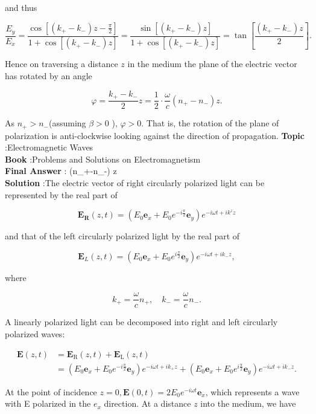 \documentclass[10pt]{article}
\begin{document}
and thus

$$
\frac{E_{y}}{E_{x}}=\frac{\cos \left[\left(k_{+}-k_{-}\right) z-\frac{\pi}{2}\right]}{1+\cos \left[\left(k_{+}-k_{-}\right) z\right]}=\frac{\sin \left[\left(k_{+}-k_{-}\right) z\right]}{1+\cos \left[\left(k_{+}-k_{-}\right) z\right]}=\tan \left[\frac{\left(k_{+}-k_{-}\right) z}{2}\right] .
$$

Hence on traversing a distance $z$ in the medium the plane of the electric vector has rotated by an angle

$$
\varphi=\frac{k_{+}-k_{-}}{2} z=\frac{1}{2} \cdot \frac{\omega}{c}\left(n_{+}-n_{-}\right) z .
$$

As $n_{+}>n_{-}$(assuming $\beta>0$ ), $\varphi>0$. That is, the rotation of the plane of polarization is anti-clockwise looking against the direction of propagation.
\textbf{Topic} :Electromagnetic Waves\\
\textbf{Book} :Problems and Solutions on Electromagnetism\\
\textbf{Final Answer} : \cdot {}\left(n_{+}-n_{-}\right) z\\


\textbf{Solution} :The electric vector of right circularly polarized light can be represented by the real part of

$$
\mathbf{E}_{\mathbf{R}}(z, t)=\left(E_{0} \mathbf{e}_{x}+E_{0} e^{-i \frac{\pi}{2}} \mathbf{e}_{y}\right) e^{-i \omega t+i k^{z} z}
$$

and that of the left circularly polarized light by the real part of

$$
\mathbf{E}_{L}(z, t)=\left(E_{0} \mathbf{e}_{x}+E_{0} e^{i \frac{\pi}{2}} \mathbf{e}_{y}\right) e^{-i \omega t+i k_{-} z},
$$

where

$$
k_{+}=\frac{\omega}{c} n_{+}, \quad k_{-}=\frac{\omega}{c} n_{-} .
$$

 A linearly polarized light can be decomposed into right and left circularly polarized waves:

$$
\begin{aligned}
\mathbf{E}(z, t) &=\mathbf{E}_{\mathrm{R}}(z, t)+\mathbf{E}_{\mathrm{L}}(z, t) \\
&=\left(E_{0} \mathbf{e}_{x}+E_{0} e^{-i \frac{\pi}{2}} \mathbf{e}_{y}\right) e^{-i \omega t+i k_{+} z}+\left(E_{0} \mathbf{e}_{x}+E_{0} e^{i \frac{\pi}{2}} \mathbf{e}_{y}\right) e^{-i \omega t+i k_{-} z} .
\end{aligned}
$$

At the point of incidence $z=0, \mathbf{E}(0, t)=2 E_{0} e^{-i \omega t} \mathbf{e}_{x}$, which represents a wave with E polarized in the $e_{x}$ direction. At a distance $z$ into the medium, we have
\end{document}
